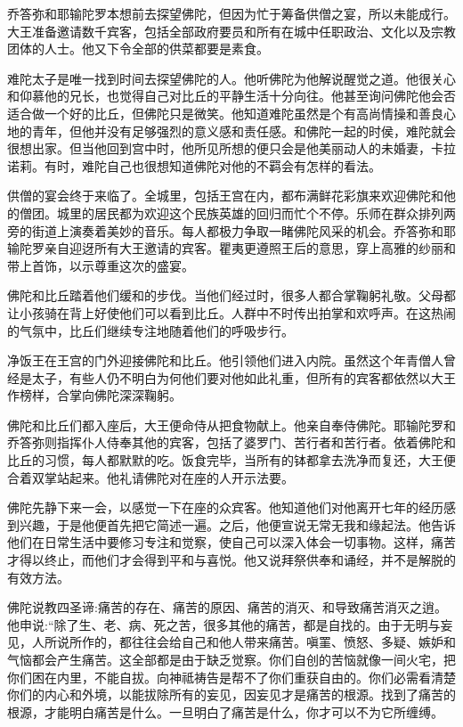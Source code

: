 \documentclass[12pt,twoside,openany]{book}
\begin{document}
乔答弥和耶输陀罗本想前去探望佛陀，但因为忙于筹备供僧之宴，所以未能成行。大王准备邀请数千宾客，包括全部政府要员和所有在城中任职政治、文化以及宗教团体的人士。他又下令全部的供菜都要是素食。

难陀太子是唯一找到时间去探望佛陀的人。他听佛陀为他解说醒觉之道。他很关心和仰慕他的兄长，也觉得自己对比丘的平静生活十分向往。他甚至询问佛陀他会否适合做一个好的比丘，但佛陀只是微笑。他知道难陀虽然是个有高尚情操和善良心地的青年，但他并没有足够强烈的意义感和责任感。和佛陀一起的时侯，难陀就会很想出家。但当他回到宫中时，他所见所想的便只会是他美丽动人的未婚妻，卡拉诺莉。有时，难陀自己也很想知道佛陀对他的不羁会有怎样的看法。

供僧的宴会终于来临了。全城里，包括王宫在内，都布满鲜花彩旗来欢迎佛陀和他的僧团。城里的居民都为欢迎这个民族英雄的回归而忙个不停。乐师在群众排列两旁的街道上演奏着美妙的音乐。每人都极力争取一睹佛陀风采的机会。乔答弥和耶输陀罗亲自迎迓所有大王邀请的宾客。瞿夷更遵照王后的意思，穿上高雅的纱丽和带上首饰，以示尊重这次的盛宴。

佛陀和比丘踏着他们缓和的步伐。当他们经过时，很多人都合掌鞠躬礼敬。父母都让小孩骑在背上好使他们可以看到比丘。人群中不时传出拍掌和欢呼声。在这热闹的气氛中，比丘们继续专注地随着他们的呼吸步行。

净饭王在王宫的门外迎接佛陀和比丘。他引领他们进入内院。虽然这个年青僧人曾经是太子，有些人仍不明白为何他们要对他如此礼重，但所有的宾客都依然以大王作榜样，合掌向佛陀深深鞠躬。

佛陀和比丘们都入座后，大王便命侍从把食物献上。他亲自奉侍佛陀。耶输陀罗和乔答弥则指挥仆人侍奉其他的宾客，包括了婆罗门、苦行者和苦行者。依着佛陀和比丘的习惯，每人都默默的吃。饭食完毕，当所有的钵都拿去洗净而复还，大王便合着双掌站起来。他礼请佛陀对在座的人开示法要。

佛陀先静下来一会，以感觉一下在座的众宾客。他知道他们对他离开七年的经历感到兴趣，于是他便首先把它简述一遍。之后，他便宣说无常无我和缘起法。他告诉他们在日常生活中要修习专注和觉察，使自己可以深入体会一切事物。这样，痛苦才得以终止，而他们才会得到平和与喜悦。他又说拜祭供奉和诵经，并不是解脱的有效方法。

佛陀说教四圣谛:痛苦的存在、痛苦的原因、痛苦的消灭、和导致痛苦消灭之逍。他申说:“除了生、老、病、死之苦，很多其他的痛苦，都是自找的。由于无明与妄见，人所说所作的，都往往会给自己和他人带来痛苦。嗔罣、愤怒、多疑、嫉妒和气恼都会产生痛苦。这全部都是由于缺乏觉察。你们自创的苦恼就像一间火宅，把你们困在内里，不能自拔。向神祗祷告是帮不了你们重获自由的。你们必需看清楚你们的内心和外境，以能拔除所有的妄见，因妄见才是痛苦的根源。找到了痛苦的根源，才能明白痛苦是什么。一旦明白了痛苦是什么，你才可以不为它所缠缚。
\end{document}

